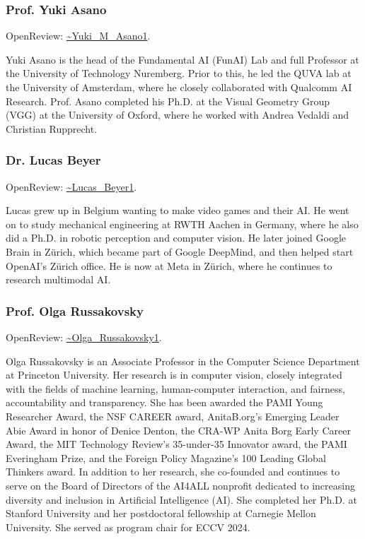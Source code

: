 \documentclass[11pt]{article}
\begin{document}
\subsubsection{Prof. Yuki Asano}

OpenReview: \href{https://openreview.net/profile?id=\string~Yuki\_M\_Asano1}{\textasciitilde{}Yuki\_M\_Asano1}.


Yuki Asano is the head of the Fundamental AI (FunAI) Lab and full Professor at the University of Technology Nuremberg. Prior to this, he led the QUVA lab at the University of Amsterdam, where he closely collaborated with Qualcomm AI Research. Prof. Asano completed his Ph.D. at the Visual Geometry Group (VGG) at the University of Oxford, where he worked with Andrea Vedaldi and Christian Rupprecht.


\subsubsection{Dr. Lucas Beyer}

OpenReview: \href{https://openreview.net/profile?id=\string~Lucas\_Beyer1}{\textasciitilde{}Lucas\_Beyer1}.


Lucas grew up in Belgium wanting to make video games and their AI. He went on to study mechanical engineering at RWTH Aachen in Germany, where he also did a Ph.D. in robotic perception and computer vision. He later joined Google Brain in Zürich, which became part of Google DeepMind, and then helped start OpenAI's Zürich office. He is now at Meta in Zürich, where he continues to research multimodal AI.


\subsubsection{Prof. Olga Russakovsky}

OpenReview: \href{https://openreview.net/profile?id=\string~Olga\_Russakovsky1}{\textasciitilde{}Olga\_Russakovsky1}.


Olga Russakovsky is an Associate Professor in the Computer Science Department at Princeton University. Her research is in computer vision, closely integrated with the fields of machine learning, human-computer interaction, and fairness, accountability and transparency. She has been awarded the PAMI Young Researcher Award, the NSF CAREER award, AnitaB.org's Emerging Leader Abie Award in honor of Denice Denton, the CRA-WP Anita Borg Early Career Award, the MIT Technology Review's 35-under-35 Innovator award, the PAMI Everingham Prize, and the Foreign Policy Magazine's 100 Leading Global Thinkers award. In addition to her research, she co-founded and continues to serve on the Board of Directors of the AI4ALL nonprofit dedicated to increasing diversity and inclusion in Artificial Intelligence (AI). She completed her Ph.D. at Stanford University and her postdoctoral fellowship at Carnegie Mellon University. She served as program chair for ECCV 2024.
\end{document}
